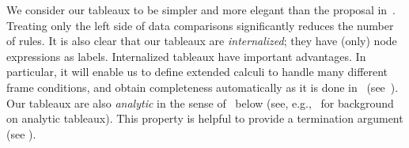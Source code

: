\documentclass[10pt,a4paper]{amsart}
\theoremstyle{definition}
\theoremstyle{remark}
\begin{document}
We consider our tableaux to be simpler and more elegant than the proposal  in~\cite{ArecesFS17}. Treating only the left side of data comparisons significantly reduces  the number of rules. It is also clear that our tableaux are \emph{internalized}; they have (only) node expressions as labels. Internalized tableaux have important advantages. In particular, it will enable us to define extended calculi to handle many different frame conditions, and obtain completeness automatically as it is done in~\cite{Blackburn00,Blackburn2002BeyondPA} (see~). 
Our tableaux are also \emph{analytic} in the sense of~ below (see, e.g.,~\cite{Smullyan1968} for background on analytic tableaux). %
This property is helpful to provide a termination argument (see ).
\end{document}
